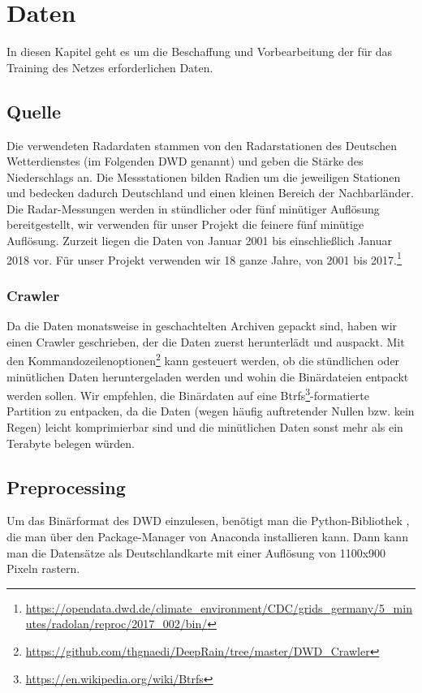 \section{Daten}
In diesen Kapitel geht es um die Beschaffung und Vorbearbeitung der für das Training des Netzes erforderlichen Daten.

\subsection{Quelle}
Die verwendeten Radardaten stammen von den Radarstationen des Deutschen Wetterdienstes (im Folgenden DWD genannt) und geben die Stärke des Niederschlags an. Die Messstationen bilden Radien um die jeweiligen Stationen und bedecken dadurch Deutschland und einen kleinen Bereich der Nachbarländer. Die Radar-Messungen werden in stündlicher oder fünf minütiger Auflösung bereitgestellt, wir verwenden für unser Projekt die feinere fünf minütige Auflösung. Zurzeit liegen die Daten von Januar 2001 bis einschließlich Januar 2018 vor. Für unser Projekt verwenden wir 18 ganze Jahre, von 2001 bis 2017.\footnote{\url{https://opendata.dwd.de/climate\_environment/CDC/grids\_germany/5\_minutes/radolan/reproc/2017\_002/bin/}}

\subsubsection{Crawler}
Da die Daten monatsweise in geschachtelten Archiven gepackt sind, haben wir einen Crawler geschrieben, der die Daten zuerst herunterlädt und auspackt. Mit den Kommandozeilenoptionen\footnote{\url{https://github.com/thgnaedi/DeepRain/tree/master/DWD_Crawler}} kann gesteuert werden, ob die stündlichen oder mi­nüt­lichen Daten heruntergeladen werden und wohin die Binärdateien entpackt werden sollen. Wir empfehlen, die Binärdaten auf eine Btrfs\footnote{\url{https://en.wikipedia.org/wiki/Btrfs}}-formatierte Partition zu entpacken, da die Daten (wegen häufig auftretender Nullen bzw. kein Regen) leicht komprimierbar sind und die minütlichen Daten sonst mehr als ein Terabyte belegen würden.

\subsection{Preprocessing}
Um das Binärformat des DWD einzulesen, benötigt man die Python-Bibliothek , die man über den Package-Manager von Anaconda installieren kann. Dann kann man die Datensätze als Deutschlandkarte mit einer Auflösung von 1100x900 Pixeln rastern.

